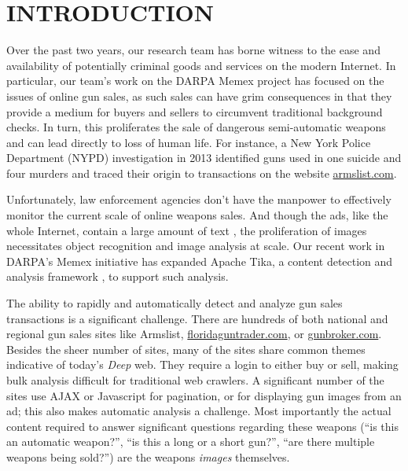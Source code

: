 \section{INTRODUCTION}
Over the past two years, our research team has borne witness to the ease and availability of potentially criminal goods and services on the modern Internet. In particular, our team's work on the DARPA Memex project has focused on the issues of online gun sales, as such sales can have grim consequences in that they provide a medium for buyers and sellers to circumvent traditional background checks. In turn, this proliferates the sale of dangerous semi-automatic weapons and can lead directly to loss of human life. For instance, a New York Police Department (NYPD) investigation in 2013 identified guns used in one suicide and four murders and traced their origin to transactions on the website \url{armslist.com}\cite{raja_2016}. 

Unfortunately, law enforcement agencies don't have the manpower to effectively monitor the current scale of online weapons sales. And though the ads, like the whole Internet, contain a large amount of text \cite{mphillips-EOT2012}, the proliferation of images necessitates object recognition and image analysis at scale. Our recent work in DARPA's Memex initiative has expanded Apache Tika, a content detection and analysis framework \cite{mattmann2011tika}, to support such analysis.

The ability to rapidly and automatically detect and analyze gun sales transactions is a significant challenge. There are hundreds of both national and regional gun sales sites like Armslist, \url{floridaguntrader.com}, or \url{gunbroker.com}. Besides the sheer number of sites, many of the sites share common themes indicative of today's {\em Deep} web. They require a login to either buy or sell, making bulk analysis difficult for traditional web crawlers. A significant number of the sites use AJAX or Javascript for pagination, or for displaying gun images from an ad; this also makes automatic analysis a challenge. Most importantly the actual content required to answer significant questions regarding these weapons (``is this an automatic weapon?'', ``is this a long or a short gun?'', ``are there multiple weapons being sold?'') are the weapons {\em images} themselves.

